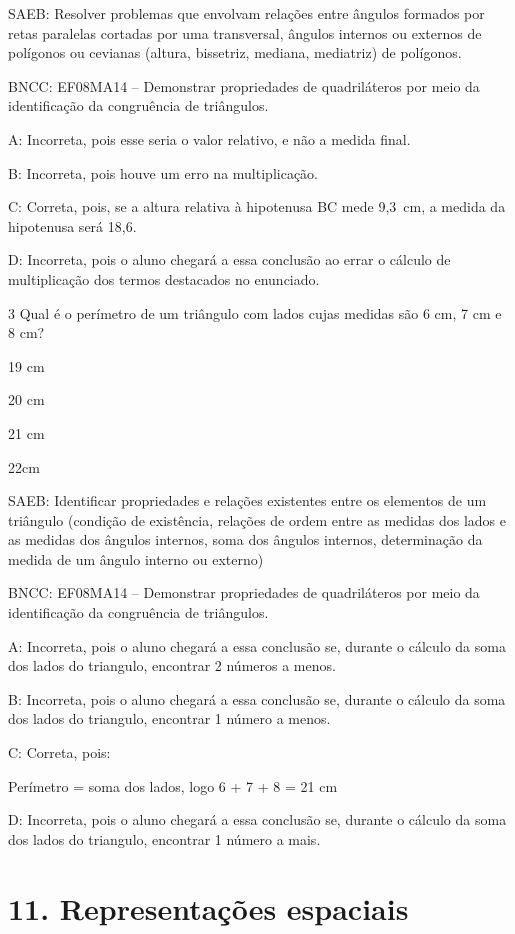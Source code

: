 {SAEB: Resolver problemas que envolvam relações entre ângulos formados
por retas paralelas cortadas por uma transversal, ângulos internos ou
externos de polígonos ou cevianas (altura, bissetriz, mediana,
mediatriz) de polígonos.

BNCC: EF08MA14 -- Demonstrar propriedades de quadriláteros por meio da
identificação da congruência de triângulos.

A: Incorreta, pois esse seria o valor relativo, e não a medida final.

B: Incorreta, pois houve um erro na multiplicação.

C: Correta, pois, se a altura relativa à hipotenusa BC mede 9,3~cm, a
medida da hipotenusa será 18,6.

D: Incorreta, pois o aluno chegará a essa conclusão ao errar o cálculo
de multiplicação dos termos destacados no enunciado.

\num{3} Qual é o perímetro de um triângulo com lados cujas medidas são 6 cm,
7 cm e 8 cm?
\item 19 cm
\item 20 cm
\item 21 cm 
\item 22cm



SAEB: Identificar propriedades e relações existentes entre os elementos
de um triângulo (condição de existência, relações de ordem entre as
medidas dos lados e as medidas dos ângulos internos, soma dos ângulos
internos, determinação da medida de um ângulo interno ou externo)

BNCC: EF08MA14 -- Demonstrar propriedades de quadriláteros por meio da
identificação da congruência de triângulos.

A: Incorreta, pois o aluno chegará a essa conclusão se, durante o
cálculo da soma dos lados do triangulo, encontrar 2 números a menos.

B: Incorreta, pois o aluno chegará a essa conclusão se, durante o
cálculo da soma dos lados do triangulo, encontrar 1 número a menos.

C: Correta, pois:

Perímetro = soma dos lados, logo 6 + 7 + 8 = 21 cm

D: Incorreta, pois o aluno chegará a essa conclusão se, durante o
cálculo da soma dos lados do triangulo, encontrar 1 número a mais.


\chapter{11. Representações
espaciais}

}
